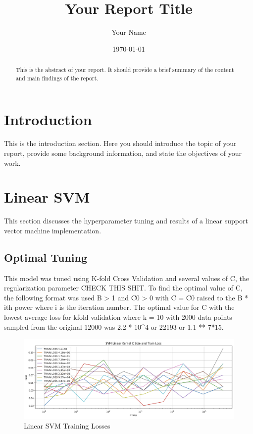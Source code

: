 \documentclass[12pt]{article}
\title{Your Report Title}
\author{Your Name}
\date{\today}
\begin{document}
\maketitle

\begin{abstract}
This is the abstract of your report. It should provide a brief summary of the content and main findings of the report.
\end{abstract}

\section{Introduction}
This is the introduction section. Here you should introduce the topic of your report, provide some background information, and state the objectives of your work.

\section{Linear SVM }

This section discusses the hyperparameter tuning and results of a linear support vector machine implementation. 

\subsection{Optimal Tuning}
This model was tuned using K-fold Cross Validation and several values of C, the regularization parameter CHECK THIS SHIT. 
To find the optimal value of C, the following format was used B > 1 and C0 > 0 with C = C0 raised to the B * ith power where i is the iteration number. The optimal value for C with the lowest average loss for kfold validation where k = 10 with 2000 data points sampled from the original 12000 was 2.2 * 10^4 or 22193 or 1.1 ** 7*15.

\begin{figure}
    \centering
    \includegraphics{Assets/LinearSVM_TrainLosses.png}
    \caption{Linear SVM Training Losses}
\end{figure}
\end{document}
